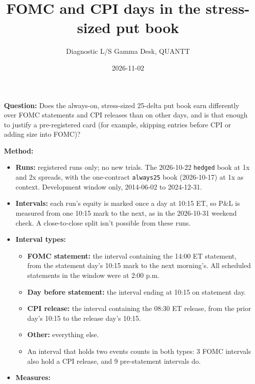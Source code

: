 \documentclass{article}
\title{FOMC and CPI days in the stress-sized put book}
\author{Diagnostic \textperiodcentered{} L/S Gamma Desk, QUANTT}
\date{2026-11-02}
\begin{document}
\maketitle

\textbf{Question:} Does the always-on, stress-sized 25-delta put book earn differently over FOMC statements and CPI releases than on other days, and is that enough to justify a pre-registered card (for example, skipping entries before CPI or adding size into FOMC)?

\textbf{Method:}

\begin{itemize}

\item \textbf{Runs:} registered runs only; no new trials. The 2026-10-22 \texttt{hedged} book at 1x and 2x spreads, with the one-contract \texttt{always25} book (2026-10-17) at 1x as context. Development window only, 2014-06-02 to 2024-12-31.

\item \textbf{Intervals:} each run's equity is marked once a day at 10:15 ET, so P\&L is measured from one 10:15 mark to the next, as in the 2026-10-31 weekend check. A close-to-close split isn't possible from these runs.

\item \textbf{Interval types:}

\begin{itemize}

\item \textbf{FOMC statement:} the interval containing the 14:00 ET statement, from the statement day's 10:15 mark to the next morning's. All scheduled statements in the window were at 2:00 p.m.

\item \textbf{Day before statement:} the interval ending at 10:15 on statement day.

\item \textbf{CPI release:} the interval containing the 08:30 ET release, from the prior day's 10:15 to the release day's 10:15.

\item \textbf{Other:} everything else.

\item An interval that holds two events counts in both types: 3 FOMC intervals also hold a CPI release, and 9 pre-statement intervals do.

\end{itemize}

\item \textbf{Measures:}


\end{itemize}
\end{document}
